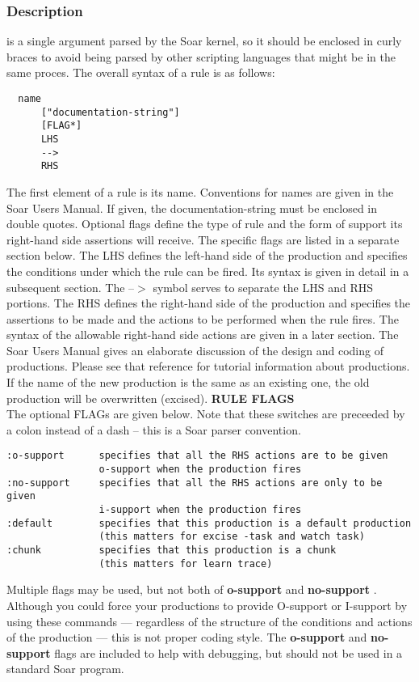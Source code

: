 \subsubsection*{Description}
 is a single argument parsed by the Soar kernel, so it should be enclosed in curly braces to avoid being parsed by other scripting languages that might be in the same proces. The overall syntax of a rule is as follows: \begin{verbatim}
  name 
      ["documentation-string"] 
      [FLAG*]
      LHS
      -->
      RHS
\end{verbatim}
 The first element of a rule is its name. Conventions for names are given in the Soar Users Manual. If given, the documentation-string must be enclosed in double quotes. Optional flags define the type of rule and the form of support its right-hand side assertions will receive. The specific flags are listed in a separate section below. The LHS defines the left-hand side of the production and specifies the conditions under which the rule can be fired. Its syntax is given in detail in a subsequent section. The --$>$ symbol serves to separate the LHS and RHS portions. The RHS defines the right-hand side of the production and specifies the assertions to be made and the actions to be performed when the rule fires. The syntax of the allowable right-hand side actions are given in a later section. The Soar Users Manual gives an elaborate discussion of the design and coding of productions. Please see that reference for tutorial information about productions. 
 If the name of the new production is the same as an existing one, the old production will be overwritten (excised). 
 \textbf{RULE FLAGS}
\\ 
 The optional FLAGs are given below. Note that these switches are preceeded by a colon instead of a dash -- this is a Soar parser convention. \begin{verbatim}
:o-support      specifies that all the RHS actions are to be given
                o-support when the production fires 
:no-support     specifies that all the RHS actions are only to be given
                i-support when the production fires 
:default        specifies that this production is a default production 
                (this matters for excise -task and watch task) 
:chunk          specifies that this production is a chunk 
                (this matters for learn trace)
\end{verbatim}
 Multiple flags may be used, but not both of \textbf{o-support}
 and \textbf{no-support}
. 
 Although you could force your productions to provide O-support or I-support by using these commands --- regardless of the structure of the conditions and actions of the production --- this is not proper coding style. The \textbf{o-support}
 and \textbf{no-support}
 flags are included to help with debugging, but should not be used in a standard Soar program. 
